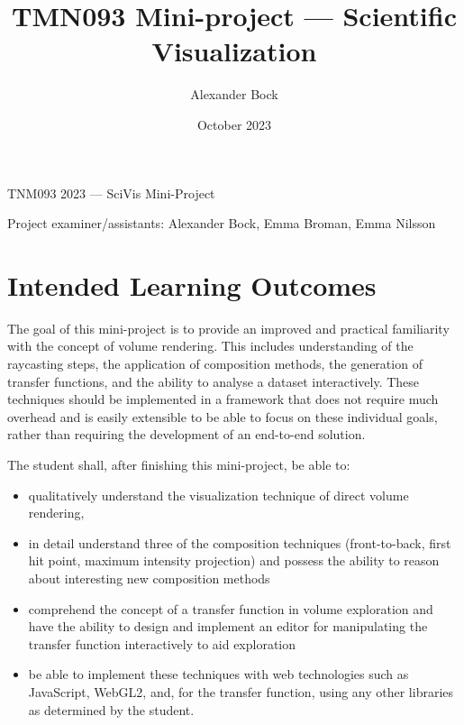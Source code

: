 \documentclass{labinstructions}
\begin{document}
\setcounter{page}{1}

\pagestyle{empty}


%
%
\begin{center}
{\Huge TNM093 2023 --- SciVis Mini-Project}
\vspace{0.6cm}

\Large{Project examiner/assistants: Alexander Bock, Emma Broman, Emma Nilsson}
\end{center}

\title{TMN093 Mini-project --- Scientific Visualization}
\author{Alexander Bock}
\date{October 2023}

\pagestyle{fancy}
\fancyfoot[c]{}
\fancyfoot[R]{\thepage}

\section{Intended Learning Outcomes}
The goal of this mini-project is to provide an improved and practical familiarity with the concept of volume rendering.  This includes understanding of the raycasting steps, the application of composition methods, the generation of transfer functions, and the ability to analyse a dataset interactively.  These techniques should be implemented in a framework that does not require much overhead and is easily extensible to be able to focus on these individual goals, rather than requiring the development of an end-to-end solution.

The student shall, after finishing this mini-project, be able to:
\begin{itemize}
  \item qualitatively understand the visualization technique of direct volume rendering,
  \item in detail understand three of the composition techniques (front-to-back, first hit point, maximum intensity projection) and possess the ability to reason about interesting new composition methods
  \item comprehend the concept of a transfer function in volume exploration and have the ability to design and implement an editor for manipulating the transfer function interactively to aid exploration
  \item be able to implement these techniques with web technologies such as JavaScript, WebGL2, and, for the transfer function, using any other libraries as determined by the student.
\end{itemize}{}
\end{document}
